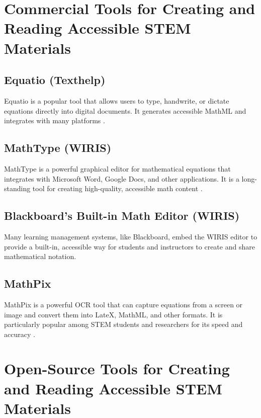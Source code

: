 \section{Commercial Tools for Creating and Reading Accessible STEM Materials}\label{ch11:sec:commercial-tools}
\subsection{Equatio (Texthelp)}\label{ch11:ssec:equatio}
Equatio is a popular tool that allows users to type, handwrite, or dictate equations directly into digital documents. It generates accessible \gls{MathML} and integrates with many platforms \supercite{TexthelpEquatio}.

\subsection{MathType (WIRIS)}\label{ch11:ssec:mathtype}
MathType is a powerful graphical editor for mathematical equations that integrates with Microsoft Word, Google Docs, and other applications. It is a long-standing tool for creating high-quality, accessible math content \supercite{WIRISMathType}.

\subsection{Blackboard's Built-in Math Editor (WIRIS)}\label{ch11:ssec:blackboard-wiris}
Many learning management systems, like Blackboard, embed the WIRIS editor to provide a built-in, accessible way for students and instructors to create and share mathematical notation.

\subsection{MathPix}\label{ch11:ssec:MathPix}
MathPix is a powerful \gls{OCR} tool that can capture equations from a screen or image and convert them into \gls{LateX}, \gls{MathML}, and other formats. It is particularly popular among STEM students and researchers for its speed and accuracy \supercite{MathPix}.

\section{Open-Source Tools for Creating and Reading Accessible STEM Materials}\label{ch11:sec:open-source-tools}
